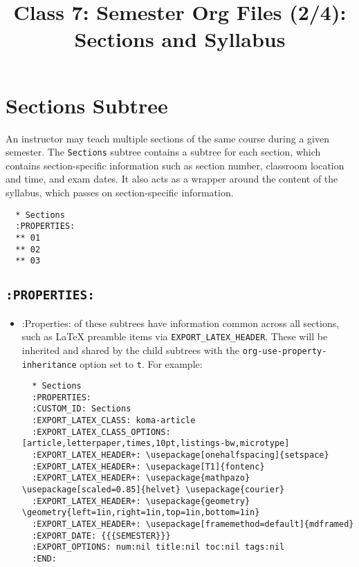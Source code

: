 \documentclass[10pt,article]{article}
\date{\vspace{-6ex}}
\title{Class 7: Semester Org Files (2/4): Sections and Syllabus}
\begin{document}
\maketitle
{} 
\thispagestyle{fancy}

\setcounter{tocdepth}{1}
\tableofcontents
\vspace{6ex}

\section{Sections Subtree}
\label{sec:orgb518f6b}
An instructor may teach multiple sections of the same course during a
given semester. The \texttt{Sections} subtree contains a subtree for each
section, which contains section-specific information such as section
number, classroom location and time, and exam dates. It also acts as a
wrapper around the content of the syllabus, which passes on section-specific
information.

\begin{verbatim}
  * Sections
  :PROPERTIES:
  ** 01
  ** 02
  ** 03
\end{verbatim}
\subsection{\texttt{:PROPERTIES:}}
\label{sec:org1f2d8ed}
\begin{itemize}
\item :Properties: of these subtrees have information common across all sections,
such as \LaTeX{} preamble items via \texttt{EXPORT\_LATEX\_HEADER}. These will be
inherited and shared by the child subtrees with the
\texttt{org-use-property-inheritance} option set to \texttt{t}. For example:
{\footnotesize
\begin{verbatim}
  * Sections
  :PROPERTIES:
  :CUSTOM_ID: Sections
  :EXPORT_LATEX_CLASS: koma-article
  :EXPORT_LATEX_CLASS_OPTIONS: [article,letterpaper,times,10pt,listings-bw,microtype]
  :EXPORT_LATEX_HEADER+: \usepackage[onehalfspacing]{setspace}
  :EXPORT_LATEX_HEADER+: \usepackage[T1]{fontenc}
  :EXPORT_LATEX_HEADER+: \usepackage{mathpazo} \usepackage[scaled=0.85]{helvet} \usepackage{courier}
  :EXPORT_LATEX_HEADER+: \usepackage{geometry} \geometry{left=1in,right=1in,top=1in,bottom=1in}
  :EXPORT_LATEX_HEADER+: \usepackage[framemethod=default]{mdframed}
  :EXPORT_DATE: {{{SEMESTER}}}
  :EXPORT_OPTIONS: num:nil title:nil toc:nil tags:nil
  :END:
\end{verbatim}
}
\end{itemize}
\end{document}
